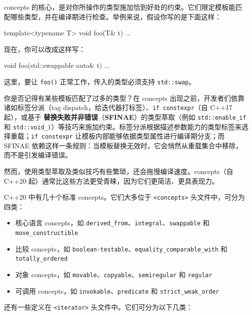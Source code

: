 concepts 的核心，是对你所操作的类型施加恰到好处的约束。它们限定模板能匹配哪些类型，并在编译期进行检查。举例来说，假设你写的是下面这样：

\begin{codebox}[cpp]
template<typename T>
void foo(T& t) {...}
\end{codebox}

现在，你可以改成这样写：

\begin{codebox}[cpp]
void foo(std::swappable auto& t) {...}
\end{codebox}

这里，要让 \texttt{foo()} 正常工作，传入的类型必须支持 \texttt{std::swap}。

\label{idx:506}
\label{idx:507}
你是否记得有某些模板匹配了过多的类型？在 concepts 出现之前，开发者们依靠诸如标签分派（tag dispatch，给迭代器打标签）、\texttt{if constexpr}（自 C++17 起），或基于 \textbf{替换失败并非错误}（\textbf{SFINAE}）的类型萃取（例如 \texttt{std::\allowbreak{}enable\_\allowbreak{}if} 和 \texttt{std::\allowbreak{}void\_\allowbreak{})\allowbreak{}}）等技巧来施加约束。标签分派根据描述参数能力的类型标签来选择重载；\texttt{if constexpr} 让模板内部能够依据类型属性进行编译期分支；而 SFINAE 依赖这样一条规则：当模板替换无效时，它会悄然从重载集合中移除，而不是引发编译错误。

然而，使用类型萃取及类似技巧有些繁琐，还会拖慢编译速度。concepts（自 C++20 起）通常比这些方法更受青睐，因为它们更简洁、更具表现力。

C++20 中有几十个标准 concepts。它们大多位于 \texttt{<concepts>} 头文件中，可分为四类：

\begin{itemize}
\item 核心语言 concepts，如 \texttt{derived\_\allowbreak{}from}、\texttt{integral}、\texttt{swappable} 和 \texttt{move\_\allowbreak{}constructible}
\item 比较 concepts，如 \texttt{boolean-testable}、\texttt{equality\_\allowbreak{}comparable\_\allowbreak{}with} 和 \texttt{totally\_\allowbreak{}ordered}
\item 对象 concepts，如 \texttt{movable}、\texttt{copyable}、\texttt{semiregular} 和 \texttt{regular}
\item 可调用 concepts，如 \texttt{invokable}、\texttt{predicate} 和 \texttt{strict\_\allowbreak{}weak\_\allowbreak{}order}
\end{itemize}

还有一些定义在 \texttt{<iterator>} 头文件中。它们可分为以下几类：

